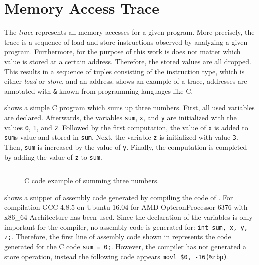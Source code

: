\documentclass[onecolumn, openright, master, english, signatures]{dbrgrptt}
\begin{document}
\section{Memory Access Trace}\label{sec:memory-access-trace}

The \emph{\ac{trace}} represents all memory accesses for a given program. More precisely, the \ac{trace} is a sequence of load and store instructions observed by analyzing a given program. Furthermore, for the purpose of this work is does not matter which value is stored at a certain address. Therefore, the stored values are all dropped. This results in a sequence of tuples consisting of the instruction type, which is either \emph{load} or \emph{store}, and an address.  shows an example of a \ac{trace}, addresses are annotated with \texttt{\&} known from programming languages like C.

 shows a simple C program which sums up three numbers. First, all used variables are declared. Afterwards, the variables \texttt{sum}, \texttt{x}, and \texttt{y} are initialized with the values \texttt{0}, \texttt{1}, and \texttt{2}. Followed by the first computation, the value of \texttt{x} is added to \texttt{sum}s value and stored in \texttt{sum}. Next, the variable \texttt{z} is initialized with value \texttt{3}. Then, \texttt{sum} is increased by the value of \texttt{y}. Finally, the computation is completed by adding the value of \texttt{z} to \texttt{sum}.

\begin{figure}[!ht]
  \centering
  \begin{tabular}{c}
  
  \end{tabular}
  \caption{C code example of summing three numbers.}
  \label{fig:mat-example-c-code}
\end{figure}

 shows a snippet of assembly code generated by compiling the code of . For compilation GCC 4.8.5 on Ubuntu 16.04 for AMD Opteron\texttrademark Processor 6376 with x86\_64 Architecture has been used. Since the declaration of the variables is only important for the compiler, no assembly code is generated for: \texttt{int sum, x, y, z;}. Therefore, the first line of assembly code shown in  represents the code generated for the C code \texttt{sum = 0;}. However, the compiler has not generated a store operation, instead the following code appears \texttt{movl \$0, -16(\%rbp)}.
\end{document}
